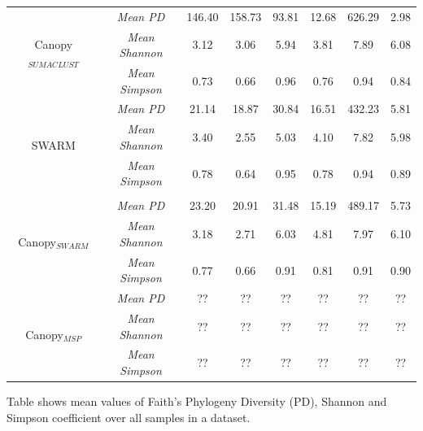 \documentclass[10pt, conference, compsocconf]{IEEEtran}
\begin{document}
\begin{table}[t]
{\begin{tabular}{|c|c c c c| c c c|}
\multirow{3}{*}{Canopy$_{SUMACLUST}$} & \textit{Mean PD} & 146.40 & 158.73 & 93.81 & 12.68 & 626.29 & 2.98\\
& \textit{Mean Shannon} & 3.12 & 3.06 & 5.94 & 3.81 & 7.89 & 6.08\\
& \textit{Mean Simpson} & 0.73 & 0.66 & 0.96 & 0.76 & 0.94 & 0.84\\

\hline

\multirow{3}{*}{SWARM} & \textit{Mean PD} & 21.14 & 18.87 & 30.84 & 16.51 & 432.23 & 5.81\\
& \textit{Mean Shannon} & 3.40 & 2.55 & 5.03 & 4.10 & 7.82 & 5.98\\
& \textit{Mean Simpson} & 0.78 & 0.64 & 0.95 & 0.78 & 0.94 & 0.89\\
 
 & & & & & & & \\

\multirow{3}{*}{Canopy$_{SWARM}$} & \textit{Mean PD} & 23.20 & 20.91 & 31.48 & 15.19 & 489.17 & 5.73\\
& \textit{Mean Shannon} & 3.18 & 2.71 & 6.03 & 4.81 & 7.97 & 6.10\\
& \textit{Mean Simpson} & 0.77 & 0.66 & 0.91 & 0.81 & 0.91 & 0.90\\

\hline

\multirow{3}{*}{Canopy$_{MSP}$} & \textit{Mean PD} & ?? & ?? & ?? & ?? & ?? & ??\\
& \textit{Mean Shannon} & ?? & ?? & ?? & ?? & ?? & ??\\
& \textit{Mean Simpson} & ?? & ?? & ?? & ?? & ?? & ??\\

\hline

\end{tabular}
}
\small
\begin{tablenotes}
	\item Table shows mean values of Faith’s Phylogeny Diversity (PD), Shannon and Simpson coefficient over all samples in a dataset.      
\end{tablenotes}

\end{table} 
\end{document}
